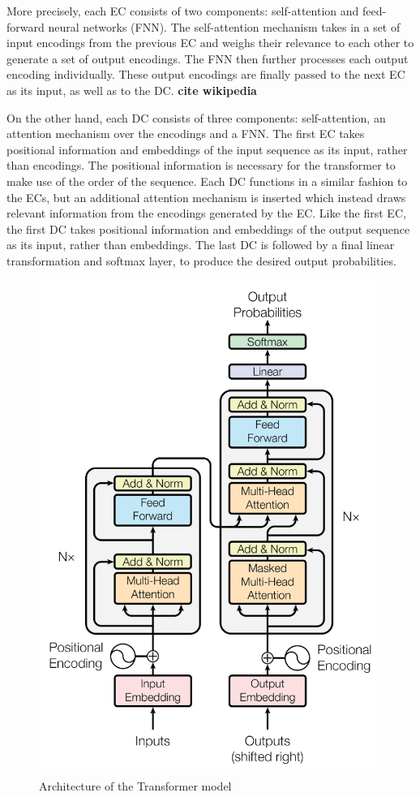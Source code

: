 \documentclass[11pt,a4paper]{article}
\begin{document}
More precisely, each EC consists of two components: self-attention and feed-forward neural networks (FNN). The self-attention mechanism takes in a set of input encodings from the previous EC and weighs their relevance to each other to generate a set of output encodings. The FNN then further processes each output encoding individually. These output encodings are finally passed to the next EC as its input, as well as to the DC. \textbf{cite wikipedia}

On the other hand, each DC consists of three components: self-attention, an attention mechanism over the encodings and a FNN. The first EC takes positional information and embeddings of the input sequence as its input, rather than encodings. The positional information is necessary for the transformer to make use of the order of the sequence. Each DC functions in a similar fashion to the ECs, but an additional attention mechanism is inserted which instead draws relevant information from the encodings generated by the EC. Like the first EC, the first DC takes positional information and embeddings of the output sequence as its input, rather than embeddings. The last DC is followed by a final linear transformation and softmax layer, to produce the desired output probabilities.

\begin{figure}[h]
    \centering
    \includegraphics[scale=0.5]{paper/images/Transformer.PNG}
    \caption{Architecture of the Transformer model}
    \label{fig:transformer}
\end{figure}
\end{document}
